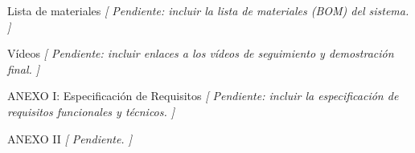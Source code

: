 \documentclass[12pt,a4paper]{article}
\makeatletter
\newcommand{\secfmt}[1]{%
  \noindent\colorbox{BlueHeader}{%
    \parbox[b]{\dimexpr\linewidth-2\fboxsep}{%
      \vspace{5pt}%
      \textcolor{white}{\large\bfseries #1}%
      \vspace{5pt}%
    }%
  }\par\vspace{4pt}%
}
\renewcommand\section{%
  \@ifstar\section@star\section@nostar
}
\newcommand\section@nostar[1]{%
  \refstepcounter{section}%
  \addcontentsline{toc}{section}{\protect\numberline{\thesection}#1}%
  \secfmt{\thesection.\enspace #1}%
}
\newcommand\section@star[1]{%
  \secfmt{#1}%
}
\makeatother
\begin{document}
\section{Lista de materiales}
\textit{[ Pendiente: incluir la lista de materiales (BOM) del sistema. ]}

\section{Vídeos}
\textit{[ Pendiente: incluir enlaces a los vídeos de seguimiento y demostración final. ]}

\section{ANEXO I: Especificación de Requisitos}
\textit{[ Pendiente: incluir la especificación de requisitos funcionales y técnicos. ]}

\section{ANEXO II}
\textit{[ Pendiente. ]}
\end{document}
